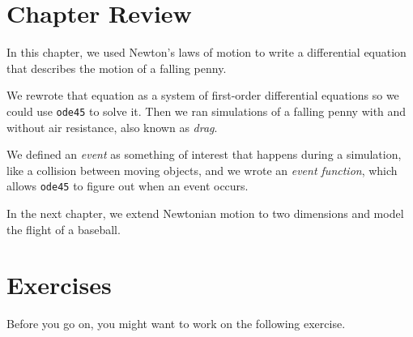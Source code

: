 \section{Chapter Review}

In this chapter, we used Newton's laws of motion to write a differential equation that describes the motion of a falling penny.

We rewrote that equation as a system of first-order differential equations so we could use \lstinline{ode45} to solve it.  Then we ran simulations of a falling penny with and without air resistance, also known as \emph{drag}.

We defined an \emph{event} as something of interest that happens during a simulation, like a collision between moving objects, and we wrote an \emph{event function}, which allows \lstinline{ode45} to figure out when an event occurs.

In the next chapter, we extend Newtonian motion to two dimensions and model the flight of a baseball.


\section{Exercises}

Before you go on, you might want to work on the following exercise.

